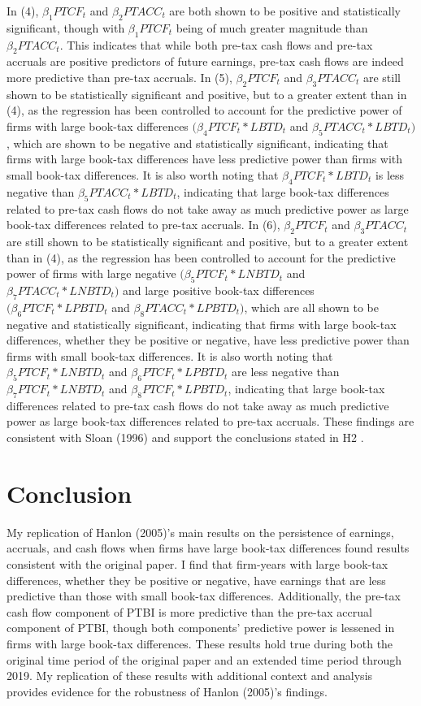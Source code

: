 \documentclass{article}
\begin{document}
In (4), $\beta_1PTCF_t$ and $\beta_2PTACC_t$ are both shown to be positive and statistically significant, though with $\beta_1PTCF_t$ being of much greater magnitude than $\beta_2PTACC_t$. This indicates that while both pre-tax cash flows and pre-tax accruals are positive predictors of future earnings, pre-tax cash flows are indeed more predictive than pre-tax accruals. In (5), $\beta_2PTCF_t$ and $\beta_3PTACC_t$ are still shown to be statistically significant and positive, but to a greater extent than in (4), as the regression has been controlled to account for the predictive power of firms with large book-tax differences $(\beta_4PTCF_t * LBTD_t$ and $\beta_5PTACC_t * LBTD_t)$, which are shown to be negative and statistically significant, indicating that firms with large book-tax differences have less predictive power than firms with small book-tax differences. It is also worth noting that $\beta_4PTCF_t * LBTD_t$ is less negative than $\beta_5PTACC_t * LBTD_t$, indicating that large book-tax differences related to pre-tax cash flows do not take away as much predictive power as large book-tax differences related to pre-tax accruals. In (6), $\beta_2PTCF_t$ and $\beta_3PTACC_t$ are still shown to be statistically significant and positive, but to a greater extent than in (4), as the regression has been controlled to account for the predictive power of firms with large negative $(\beta_5PTCF_t * LNBTD_t$ and $\beta_7PTACC_t * LNBTD_t)$ and large positive book-tax differences $(\beta_6PTCF_t * LPBTD_t$ and $\beta_8PTACC_t * LPBTD_t)$, which are all shown to be negative and statistically significant, indicating that firms with large book-tax differences, whether they be positive or negative, have less predictive power than firms with small book-tax differences. It is also worth noting that $\beta_5PTCF_t * LNBTD_t$ and $\beta_6PTCF_t * LPBTD_t$ are less negative than $\beta_7PTCF_t * LNBTD_t$ and $\beta_8PTCF_t * LPBTD_t$, indicating that large book-tax differences related to pre-tax cash flows do not take away as much predictive power as large book-tax differences related to pre-tax accruals. These findings are consistent with Sloan (1996) and support the conclusions stated in H2 \citep{Sloan96}.

\section{Conclusion}
My replication of Hanlon (2005)’s main results on the persistence of earnings, accruals, and cash flows when firms have large book-tax differences found results consistent with the original paper. I find that firm-years with large book-tax differences, whether they be positive or negative, have earnings that are less predictive than those with small book-tax differences. Additionally, the pre-tax cash flow component of PTBI is more predictive than the pre-tax accrual component of PTBI, though both components’ predictive power is lessened in firms with large book-tax differences. These results hold true during both the original time period of the original paper and an extended time period through 2019. My replication of these results with additional context and analysis provides evidence for the robustness of Hanlon (2005)’s findings.
\end{document}
